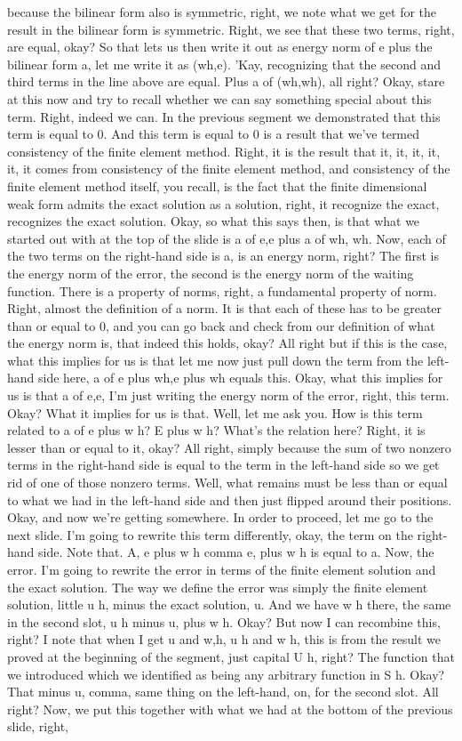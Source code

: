 \documentclass[10pt]{article}
\begin{document}
{because the bilinear form also is symmetric, right, we note what we get for the result in the bilinear form is symmetric. Right, we see that these two terms, right, are equal, okay? So that lets us then write it out as energy norm of e plus the bilinear form a, let me write it as (wh,e). 'Kay, recognizing that the second and third terms in the line above are equal. Plus a of (wh,wh), all right? Okay, stare at this now and try to recall whether we can say something special about this term. Right, indeed we can. In the previous segment we demonstrated that this term is equal to 0. And this term is equal to 0 is a result that we've termed consistency of the finite element method. Right, it is the result that it, it, it, it, it, it comes from consistency of the finite element method, and consistency of the finite element method itself, you recall, is the fact that the finite dimensional weak form admits the exact solution as a solution, right, it recognize the exact, recognizes the exact solution. Okay, so what this says then, is that what we started out with at the top of the slide is a of e,e plus a of wh, wh. Now, each of the two terms on the right-hand side is a, is an energy norm, right? The first is the energy norm of the error, the second is the energy norm of the waiting function. There is a property of norms, right, a fundamental property of norm. Right, almost the definition of a norm. It is that each of these has to be greater than or equal to 0, and you can go back and check from our definition of what the energy norm is, that indeed this holds, okay? All right but if this is the case, what this implies for us is that let me now just pull down the term from the left-hand side here, a of e plus wh,e plus wh equals this. Okay, what this implies for us is that a of e,e, I'm just writing the energy norm of the error, right, this term. Okay? What it implies for us is that. Well, let me ask you. How is this term related to a of e plus w h? E plus w h? What's the relation here? Right, it is lesser than or equal to it, okay? All right, simply because the sum of two nonzero terms in the right-hand side is equal to the term in the left-hand side so we get rid of one of those nonzero terms. Well, what remains must be less than or equal to what we had in the left-hand side and then just flipped around their positions. Okay, and now we're getting somewhere. In order to proceed, let me go to the next slide. I'm going to rewrite this term differently, okay, the term on the right-hand side. Note that. A, e plus w h comma e, plus w h is equal to a. Now, the error. I'm going to rewrite the error in terms of the finite element solution and the exact solution. The way we define the error was simply the finite element solution, little u h, minus the exact solution, u. And we have w h there, the same in the second slot, u h minus u, plus w h. Okay? But now I can recombine this, right? I note that when I get u and w,h, u h and w h, this is from the result we proved at the beginning of the segment, just capital U h, right? The function that we introduced which we identified as being any arbitrary function in S h. Okay? That minus u, comma, same thing on the left-hand, on, for the second slot. All right? Now, we put this together with what we had at the bottom of the previous slide, right, }
\end{document}
